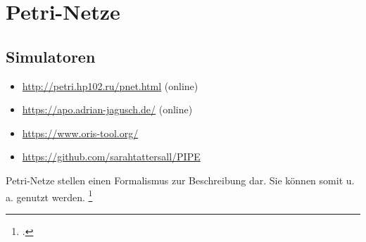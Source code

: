 \documentclass{lehramt-informatik-haupt}
\begin{document}

\chapter{Petri-Netze}

\section{Simulatoren}

\begin{itemize}
\item \url{http://petri.hp102.ru/pnet.html} (online)
\item \url{https://apo.adrian-jagusch.de/} (online)
\item \url{https://www.oris-tool.org/}
\item \url{https://github.com/sarahtattersall/PIPE}
\end{itemize}

\def\TmpBeschriftung#1{%
  {%
    \footnotesize%
    \itshape#1%
  }%
}

\noindent
Petri-Netze stellen einen Formalismus zur Beschreibung
 dar.
%
Sie können somit u.\,a. 
genutzt werden.
\footcite{sosy:fs:3}
\end{document}
